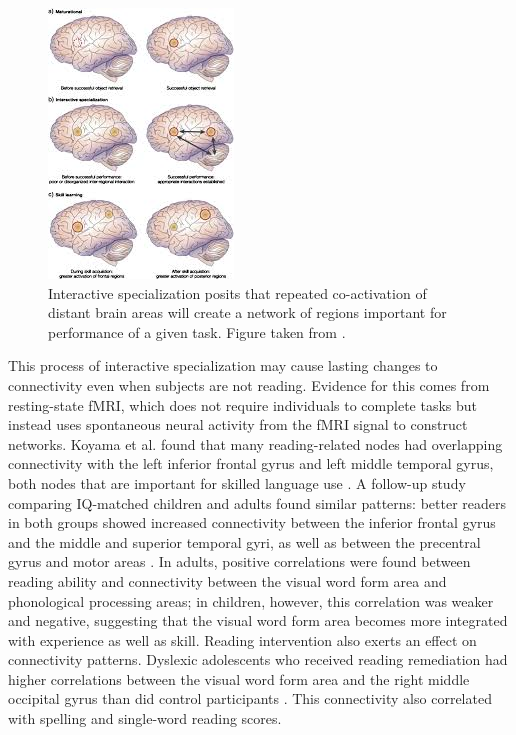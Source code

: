 \begin{figure}[h!]
\centering
\includegraphics[]{images/ch1-interactive-specialization.jpg}
    \caption{Interactive specialization posits that repeated co-activation of distant brain areas will create a network of regions important for performance of a given task. Figure taken from \citep{Gaffrey2012}.}
\label{fig:ch1-interactive-specialization}
\end{figure}

This process of interactive specialization may cause lasting changes to connectivity even when subjects are not reading. Evidence for this comes from resting-state fMRI, which does not require individuals to complete tasks but instead uses spontaneous neural activity from the fMRI signal to construct networks. Koyama et al. found that many reading-related nodes had overlapping connectivity with the left inferior frontal gyrus and left middle temporal gyrus, both nodes that are important for skilled language use \citep{Koyama2010}. A follow-up study comparing IQ-matched children and adults found similar patterns: better readers in both groups showed increased connectivity between the inferior frontal gyrus and the middle and superior temporal gyri, as well as between the precentral gyrus and motor areas \citep{Koyama2011}. In adults, positive correlations were found between reading ability and connectivity between the visual word form area and phonological processing areas; in children, however, this correlation was weaker and negative, suggesting that the visual word form area becomes more integrated with experience as well as skill. Reading intervention also exerts an effect on connectivity patterns. Dyslexic adolescents who received reading remediation had higher correlations between the visual word form area and the right middle occipital gyrus than did control participants \citep{Koyama2013}. This connectivity also correlated with spelling and single-word reading scores.

